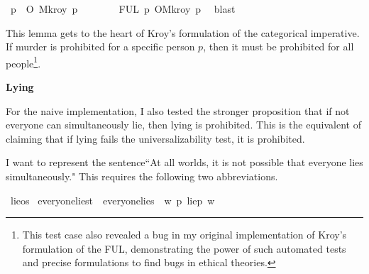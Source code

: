 \begin{isabellebody}
\ {\isachardoublequoteopen}{\isacharparenleft}{\isasymforall}p{\isachardot}\ {\isasymTurnstile}\ O\ {\isacharbraceleft}\isactrlbold {\isasymnot}{\isacharparenleft}M{\isacharunderscore}kroy\ p{\isacharparenright}{\isacharbraceright}{\isacharparenright}{\isachardoublequoteclose}\isanewline
\ \ \ \ \ \ \isamarkupfalse%
\ FUL\ {\isacartoucheopen}{\isasymexists}p{\isachardot}\ {\isasymTurnstile}\isactrlemph O{\isacharbraceleft}\isactrlemph {\isasymnot}M{\isacharunderscore}kroy{\isacharbraceright}\ p{\isacartoucheclose}\ \isamarkupfalse%
\ blast\isanewline
\ \ \isamarkupfalse%
%
\endisatagproof
{\isafoldproof}%
%
\isadelimproof
%
\endisadelimproof
%
\begin{isamarkuptext}%
This lemma gets to the heart of Kroy's formulation of the categorical imperative. If murder is prohibited
for a specific person $p$, then it must be prohibited for all people\footnote{This test case also revealed a 
bug in my original implementation of Kroy's formulation of the FUL, demonstrating the power of such 
automated tests and precise formulations to find bugs in ethical theories.}.%
\end{isamarkuptext}\isamarkuptrue%
%
\begin{isamarkuptext}%
\textbf{Lying}%
\end{isamarkuptext}\isamarkuptrue%
%
\begin{isamarkuptext}%
For the naive implementation, I also tested the stronger proposition that if not 
everyone can simultaneously lie, then lying is prohibited. This is the equivalent of claiming that 
if lying fails the universalizability test, it is prohibited.%
\end{isamarkuptext}\isamarkuptrue%
%
\begin{isamarkuptext}%
I want to represent the sentence``At all worlds, it is 
      not possible that everyone lies simultaneously." This requires the following two abbreviations.%
\end{isamarkuptext}\isamarkuptrue%
\isamarkupfalse%
\ lie{\isacharcolon}{\isacharcolon}os%
\isadelimproof
%
\endisadelimproof
%
\isatagproof
%
\endisatagproof
{\isafoldproof}%
%
\isadelimproof
%
\endisadelimproof
\isanewline
{}\isamarkupfalse%
\ everyone{\isacharunderscore}lies{\isacharcolon}{\isacharcolon}t\ \ {\isachardoublequoteopen}everyone{\isacharunderscore}lies\ {\isasymequiv}\ {\isasymlambda}w{\isachardot}\ {\isacharparenleft}{\isasymforall}p{\isachardot}\ {\isacharparenleft}lie{\isacharparenleft}p{\isacharparenright}\ w{\isacharparenright}{\isacharparenright}{\isachardoublequoteclose}\isanewline

\end{isabellebody}
